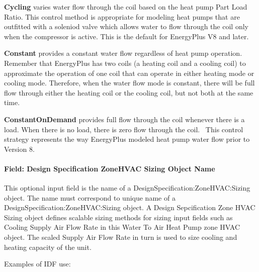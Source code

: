 \textbf{Cycling} varies water flow through the coil based on the heat pump Part Load Ratio. This control method is appropriate for modeling heat pumps that are outfitted with a soleniod valve which allows water to flow through the coil only when the compressor is active. This is the default for EnergyPlus V8 and later.

\textbf{Constant} provides a constant water flow regardless of heat pump operation. Remember that EnergyPlus has two coils (a heating coil and a cooling coil) to approximate the operation of one coil that can operate in either heating mode or cooling mode. Therefore, when the water flow mode is constant, there will be full flow through either the heating coil or the cooling coil, but not both at the same time.

\textbf{ConstantOnDemand} provides full flow through the coil whenever there is a load. When there is no load, there is zero flow through the coil.~ This control strategy represents the way EnergyPlus modeled heat pump water flow prior to Version 8.

\paragraph{Field: Design Specification ZoneHVAC Sizing Object Name}\label{field-design-specification-zonehvac-sizing-object-name-8}

This optional input field is the name of a DesignSpecification:ZoneHVAC:Sizing object. The name must correspond to unique name of a DesignSpecification:ZoneHVAC:Sizing object. A Design Sepcification Zone HVAC Sizing object defines scalable sizing methods for sizing input fields such as Cooling Supply Air Flow Rate in this Water To Air Heat Pump zone HVAC object. The scaled Supply Air Flow Rate in turn is used to size cooling and heating capacity of the unit.

Examples of IDF use:

